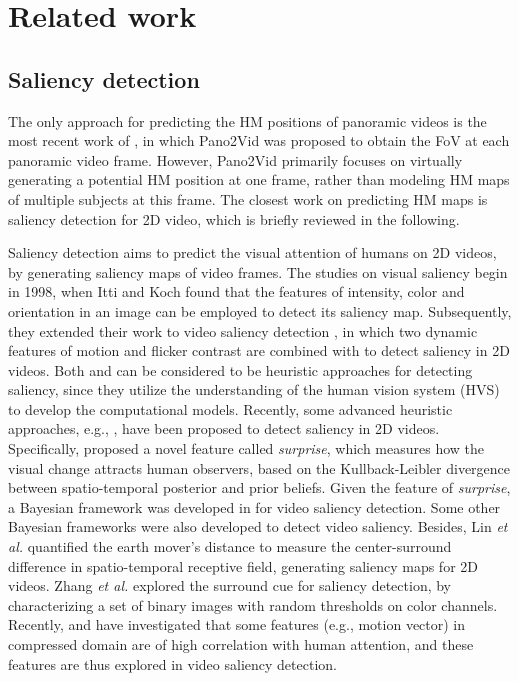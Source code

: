 \documentclass[10pt,journal,compsoc]{IEEEtran}
\begin{document}
\section{Related work}

\subsection{Saliency detection}
The only approach for predicting the HM positions of panoramic videos is the most recent work of \cite{su2016pano2vid}, in which Pano2Vid was proposed to obtain the FoV at each panoramic video frame. However, Pano2Vid primarily focuses on virtually generating a potential HM position at one frame, rather than modeling HM maps of multiple subjects at this frame. The closest work on predicting HM maps is saliency detection for 2D video, which is briefly reviewed in the following.

Saliency detection aims to predict the visual attention of humans on 2D videos, by generating saliency maps of video frames. The studies on visual saliency begin in 1998, when Itti and Koch \cite{itti1998model} found that the features of intensity, color and orientation in an image can be employed to detect its saliency map. Subsequently, they extended their work to video saliency detection \cite{itti2004automatic}, in which two dynamic features of motion and flicker contrast are combined with \cite{itti1998model} to detect saliency in 2D videos. Both \cite{itti1998model} and \cite{itti2004automatic} can be considered to be heuristic approaches for detecting saliency, since they utilize the understanding of the human vision system (HVS) to develop the computational models. Recently, some advanced heuristic approaches, e.g.,  \cite{itti2009bayesian, boccignone2008nonparametric, zhang2009sunday, guo2010novel, ren2013regularized, lin2013visual, zhang2016exploiting, hossein2015many, xu2017learning}, have been proposed to detect saliency in 2D videos. Specifically, \cite{itti2009bayesian} proposed a novel feature called \textit{surprise}, which measures how the visual change attracts human observers, based on the Kullback-Leibler divergence between spatio-temporal posterior and prior beliefs. Given the feature of \textit{surprise}, a Bayesian framework was developed in \cite{itti2009bayesian} for video saliency detection.  Some other Bayesian frameworks \cite{boccignone2008nonparametric, zhang2009sunday}  were also developed to detect video saliency. Besides, Lin \textit{et al.} \cite{lin2013visual} quantified the earth mover's distance to measure the center-surround difference in spatio-temporal receptive field, generating saliency maps for 2D videos. Zhang \textit{et al.} \cite{zhang2016exploiting} explored the surround cue for saliency detection, by characterizing a set of binary images with random thresholds on color channels. Recently, \cite{hossein2015many} and \cite{xu2017learning} have investigated that some features (e.g., motion vector) in compressed domain are of high correlation with human attention, and these features are thus explored in video saliency detection.
\end{document}
